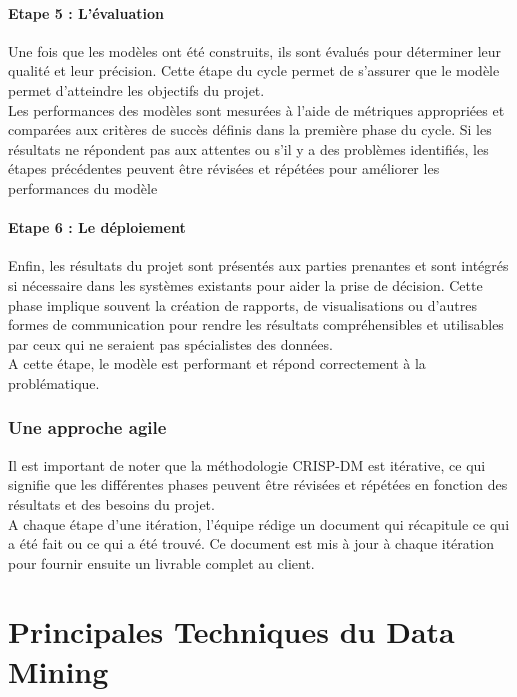 \documentclass[a4paper,12pt]{report}
\begin{document}
            \subsubsection{Etape 5 : L’évaluation}
            Une fois que les modèles ont été construits, ils sont évalués pour déterminer leur qualité et leur précision. Cette étape du cycle permet de s’assurer que le modèle permet d’atteindre les objectifs du projet. \\
            Les performances des modèles sont mesurées à l'aide de métriques appropriées et comparées aux critères de succès définis dans la première phase du cycle. Si les résultats ne répondent pas aux attentes ou s'il y a des problèmes identifiés, les étapes précédentes peuvent être révisées et répétées pour améliorer les performances du modèle
    
    
            \subsubsection{Etape 6 : Le déploiement}
            Enfin, les résultats du projet sont présentés aux parties prenantes et sont intégrés si nécessaire dans les systèmes existants pour aider la prise de décision. Cette phase implique souvent la création de rapports, de visualisations ou d'autres formes de communication pour rendre les résultats compréhensibles et utilisables par ceux qui ne seraient pas spécialistes des données. \\
            A cette étape, le modèle est performant et répond correctement à la problématique.

        \subsection{Une approche agile }
        Il est important de noter que la méthodologie CRISP-DM est itérative, ce qui signifie que les différentes phases peuvent être révisées et répétées en fonction des résultats et des besoins du projet.\\
        A chaque étape d’une itération, l’équipe rédige un document qui récapitule ce qui a été fait ou ce qui a été trouvé. Ce document est mis à jour à chaque itération pour fournir ensuite un livrable complet au client.

        
\chapter{ Principales Techniques du Data Mining}
\end{document}
